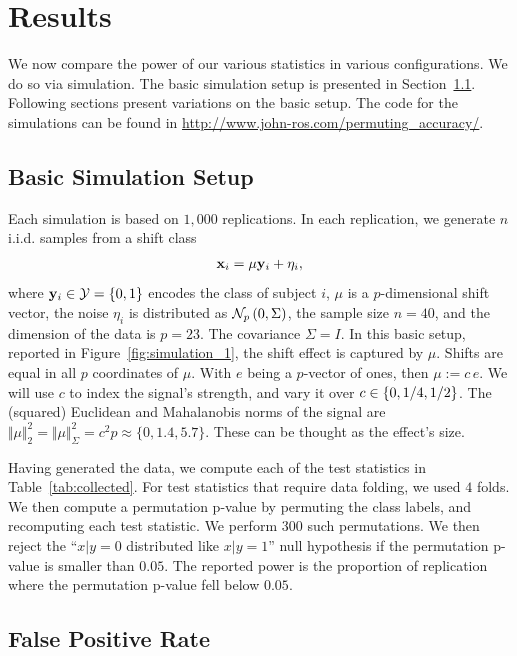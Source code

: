 \documentclass[12pt,a4paper]{article}
\begin{document}
\section{Results}
\label{sec:results}
We now compare the power of our various statistics in various configurations. 
We do so via simulation.
The basic simulation setup is presented in Section~\ref{sec:simulation_details}.
Following sections present variations on the basic setup.
The \R code for the simulations can be found in \url{http://www.john-ros.com/permuting_accuracy/}.


\subsection{Basic Simulation Setup}
\label{sec:simulation_details}

Each simulation is based on $1,000$ replications. 
In each replication, we generate $n$ i.i.d. samples from a shift class 
\begin{align}
\label{eq:distribution}
	\mathbf{x}_i = \mu \mathbf{y}_i + \eta_i,
\end{align}
where $\mathbf{y}_i \in \mathcal{Y}=\{ 0,1 \}$ encodes the class of subject $i$, $\mu$ is a $p$-dimensional shift vector, the noise $\eta_i$ is distributed as $\mathcal{N}_{p}\left(0,\Sigma\right)$, the sample size $n=40$, and the dimension of the data is $p=23$. 
The covariance $\Sigma=I$. 
In this basic setup, reported in Figure~\ref{fig:simulation_1}, the shift effect is captured by $\mu$. 
Shifts are equal in all $p$ coordinates of $\mu$.
With $e$ being a $p$-vector of ones, then $\mu:=c \, e$. 
We will use $c$ to index the signal's strength, and vary it over $c \in \{ 0,1/4,1/2 \}$.
The (squared) Euclidean and Mahalanobis norms of the signal are $\Vert \mu \Vert_2^2=\Vert \mu \Vert_\Sigma^2=c^2 p\approx \{0,1.4,5.7\}$.
These can be thought as the effect's size. 


Having generated the data, we compute each of the test statistics in Table~\ref{tab:collected}.
For test statistics that require data folding, we used $4$ folds. 
We then compute a permutation p-value by permuting the class labels, and recomputing each test statistic. 
We perform $300$ such permutations. 
We then reject the ``$x|y=0$ distributed like $x|y=1$'' null hypothesis if the permutation p-value is smaller than $0.05$.
The reported power is the proportion of replication where the permutation p-value fell below $0.05$.



\subsection{False Positive Rate}
\label{sec:type_i}
\end{document}
